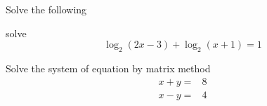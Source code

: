 \documentclass[11pt]{exam}
\begin{document}
\begin{questions}
\vspace{9cm}

\addpoints
\question Solve the following

\begin{parts}
	\part \[4^{x-2}=2^{3x+3}\]
	\vspace{2cm}
	\part \[\log_2(x^3+65)=0\]
	\vspace{3cm}
	\part \[\ln x+\ln x^2=3\]
	\vspace{2cm}
\end{parts}

\vspace{8cm}

\question solve \[\log_2(2x-3)+\log_2(x+1)=1\] 

\vspace{6cm}
\question Solve the system of equation by matrix method
\begin{align}
\nonumber
x+y=&8 \\ 
\nonumber
x-y=&4   
\end{align}
\end{questions}
\end{document}

